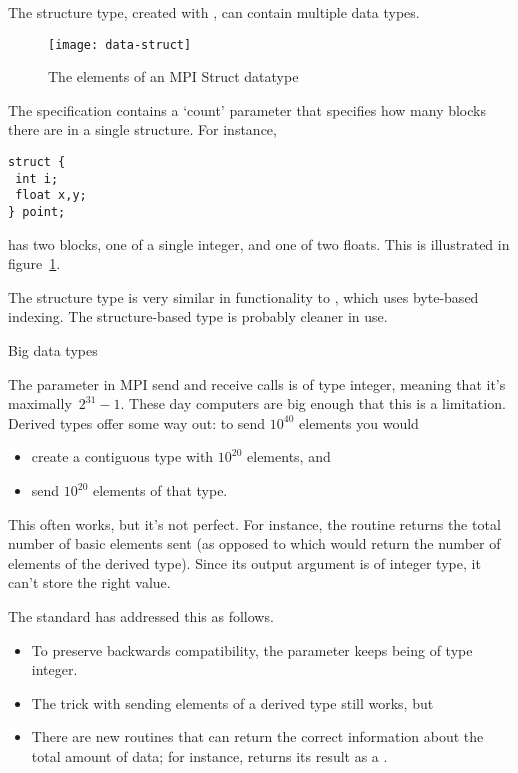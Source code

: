 The structure type, created with ,
can contain multiple data types.
\begin{figure}[ht]
  \texttt{[image: data-struct]}
  \caption{The elements of an MPI Struct datatype}
  \label{fig:data-struct}
\end{figure}
The specification contains a `count' parameter that specifies how many blocks
there are in a single structure. For instance,
\begin{verbatim}
struct {
 int i;
 float x,y;
} point;
\end{verbatim}
has two blocks, one of a single integer, and one of two floats.
This is illustrated in figure~\ref{fig:data-struct}.

The structure type is very similar in functionality to ,
which uses byte-based indexing. The structure-based type is probably cleaner
in use.


 {Big data types}

The  parameter in MPI send and receive calls is of type integer,
meaning that it's maximally~$2^{31}-1$. These day computers are big enough
that this is a limitation. Derived types offer some way out: to send $10^{40}$
elements you would
\begin{itemize}
\item create a contiguous type with $10^{20}$ elements, and
\item send $10^{20}$ elements of that type.
\end{itemize}
This often works, but it's not perfect. For instance, the routine
 returns the total number of basic elements sent
(as opposed to  which would return the number
of elements of the derived type). Since its output argument is
of integer type, it can't store the right value.

The  standard has addressed this
as follows.
\begin{itemize}
\item To preserve backwards compatibility, the  parameter keeps
  being of type integer.
\item The trick with sending elements of a derived type still works, but
\item There are new routines that can return the correct information about the
  total amount of data; for instance, 
  returns its result as a .
\end{itemize}

